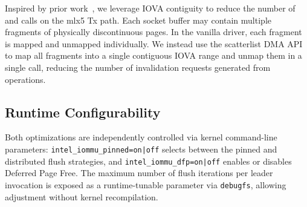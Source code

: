 Inspired by prior work~\cite{Rubin2024FastSafe},
we leverage IOVA contiguity to reduce the number of  and  calls on the mlx5 Tx path.
Each socket buffer may contain multiple fragments of physically discontinuous pages.
In the vanilla driver, each fragment is mapped and unmapped individually.
We instead use the scatterlist DMA API to map all fragments into a single contiguous IOVA range
and unmap them in a single call, reducing the number of invalidation requests
generated from  operations. %




\subsection{Runtime Configurability}
Both optimizations are independently controlled via kernel command-line parameters: \texttt{intel\_iommu\_pinned=on|off} selects between the pinned and distributed flush strategies, and
\texttt{intel\_iommu\_dfp=on|off} enables or disables Deferred Page Free.
The maximum number of flush iterations per leader invocation is exposed as a runtime-tunable parameter via \texttt{debugfs}, allowing adjustment without kernel recompilation.
\fi 




